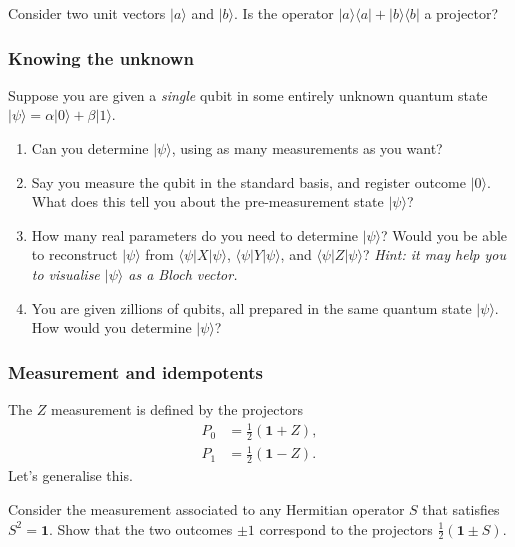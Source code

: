\documentclass[fleqn]{article}
\begin{document}
Consider two unit vectors \(|a\rangle\) and \(|b\rangle\).
Is the operator \(|a\rangle\langle a|+|b\rangle\langle b|\) a projector?

\hypertarget{knowing-the-unknown}{%
\subsubsection{Knowing the unknown}\label{knowing-the-unknown}}

Suppose you are given a \emph{single} qubit in some entirely unknown quantum state \(|\psi\rangle=\alpha|0\rangle+\beta|1\rangle\).

\begin{enumerate}
\def\labelenumi{\arabic{enumi}.}
\item
  Can you determine \(|\psi\rangle\), using as many measurements as you want?
\item
  Say you measure the qubit in the standard basis, and register outcome \(|0\rangle\).
  What does this tell you about the pre-measurement state \(|\psi\rangle\)?
\item
  How many real parameters do you need to determine \(|\psi\rangle\)?
  Would you be able to reconstruct \(|\psi\rangle\) from \(\langle\psi|X|\psi\rangle\), \(\langle\psi|Y|\psi\rangle\), and \(\langle\psi|Z|\psi\rangle\)?
  \emph{Hint: it may help you to visualise \(|\psi\rangle\) as a Bloch vector.}
\item
  You are given zillions of qubits, all prepared in the same quantum state \(|\psi\rangle\).
  How would you determine \(|\psi\rangle\)?
\end{enumerate}

\hypertarget{measurement-and-idempotents}{%
\subsubsection{Measurement and idempotents}\label{measurement-and-idempotents}}

The \(Z\) measurement is defined by the projectors
\[
  \begin{aligned}
    P_0 &= \frac{1}{2}(\mathbf{1}+ Z),
  \\P_1 &= \frac{1}{2}(\mathbf{1}- Z).
  \end{aligned}
\]
Let's generalise this.

Consider the measurement associated to any Hermitian operator \(S\) that satisfies \(S^2=\mathbf{1}\).
Show that the two outcomes \(\pm1\) correspond to the projectors \(\frac{1}{2}(\mathbf{1}\pm S)\).
\end{document}
